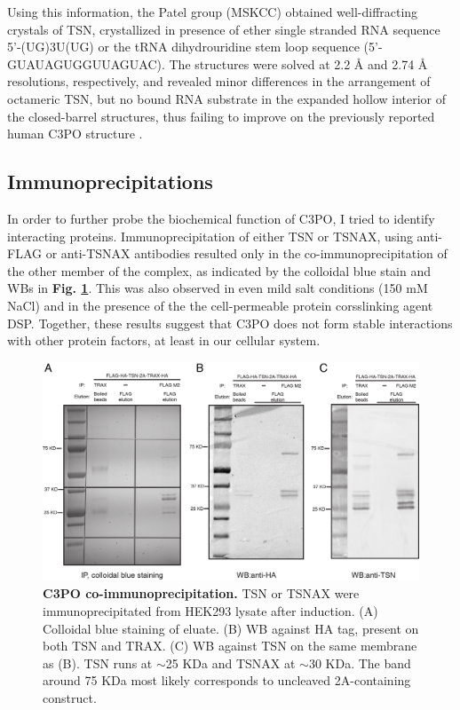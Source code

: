 \documentclass[12pt]{rockefeller}
\begin{document}
Using this information, the Patel group (MSKCC) obtained well-diffracting crystals of TSN, crystallized in presence of ether single stranded RNA sequence 5’-(UG)3U(UG) or the tRNA dihydrouridine stem loop sequence (5’-GUAUAGUGGUUAGUAC). The structures were solved at 2.2 Å and 2.74 Å resolutions, respectively, and revealed minor differences in the arrangement of octameric TSN, but no bound RNA substrate in the expanded hollow interior of the closed-barrel structures, thus failing to improve on the previously reported human C3PO structure \cite{Ye:2011boa}. 

\subsection{Immunoprecipitations}

In order to further probe the biochemical function of C3PO, I tried to identify  interacting proteins. Immunoprecipitation of either TSN or TSNAX, using anti-FLAG or anti-TSNAX antibodies resulted only in the co-immunoprecipitation of the other member of the complex, as indicated by the colloidal blue stain and WBs in \textbf{Fig. \ref{ip}}. This was also observed in even mild salt conditions (150 mM NaCl) and in the presence of the the cell-permeable protein corsslinking agent DSP. Together, these results suggest that C3PO does not form stable interactions with other protein factors, at least in our cellular system.

\begin{figure}[!ht]%
\centering
\includegraphics[width=\textwidth]{IP.png} 
\caption[C3PO co-immunoprecipitation.]
{
\textbf{C3PO co-immunoprecipitation.}
TSN or TSNAX were immunoprecipitated from HEK293 lysate after induction. (A) Colloidal blue staining of eluate. (B) WB against HA tag, present on both TSN and TRAX. (C) WB against TSN on the same membrane as (B). TSN runs at $\sim$25 KDa and TSNAX at $\sim$30 KDa. The band around 75 KDa most likely corresponds to uncleaved 2A-containing construct.
}
\centering
\label{ip}%
\end{figure}
\end{document}

